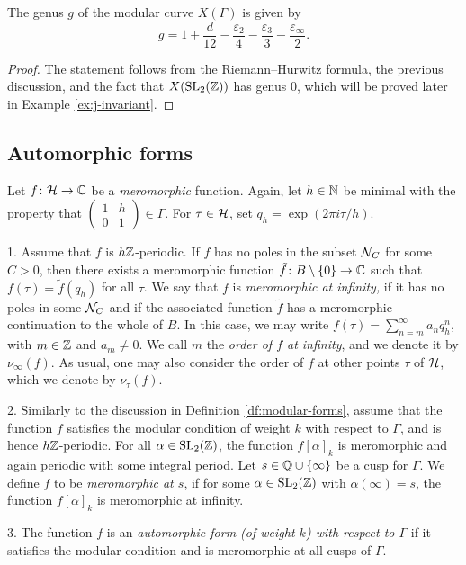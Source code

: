 \begin{prop}
 The genus $g$ of the modular curve $X(\Gamma)$ is given by
 \[g=1+\frac{d}{12}-\frac{\varepsilon_2}{4}-\frac{\varepsilon_3}{3}-\frac{\varepsilon_\infty}{2}.\]
\end{prop}

\begin{proof}
 The statement follows from the Riemann--Hurwitz formula, the previous discussion, and the fact that $X(\operatorname{SL}_2(\mathbb{Z}))$ has genus $0$, which will be proved later in Example \ref{ex:j-invariant}.
\end{proof}

\subsection{Automorphic forms}

\begin{defi}
 Let $f\colon \mathcal{H} \to \mathbb{C}$ be a \emph{meromorphic} function. Again, let $h\in\mathbb{N}$ be minimal with the property that $\left(\begin{smallmatrix}1 & h\\0 & 1\end{smallmatrix}\right)\in\Gamma$. For $\tau\in\mathcal{H}$, set $q_h=\exp(2\pi i\tau/h)$.

  1. Assume that $f$ is $h\mathbb{Z}$-periodic. If $f$ has no poles in the subset $\mathcal{N}_C$ for some $C>0$, then there exists a meromorphic function $\tilde f\colon B\setminus \{0\} \to \mathbb{C}$ such that $f(\tau)=\tilde f(q_h)$ for all $\tau$. We say that $f$ is \emph{meromorphic at infinity,} if it has no poles in some $\mathcal{N}_C$ and if the associated function $\tilde f$ has a meromorphic continuation to the whole of $B$. In this case, we may write $f(\tau)=\sum_{n=m}^\infty a_n q_h^n$, with $m\in\mathbb{Z}$ and $a_m\neq 0$. We call $m$ the \emph{order of $f$ at infinity}, and we denote it by $\nu_\infty(f)$. As usual, one may also consider the order of $f$ at other points $\tau$ of $\mathcal{H}$, which we denote by $\nu_\tau(f)$.
  
  2. Similarly to the discussion in Definition \ref{df:modular-forms}, assume that the function $f$ satisfies the modular condition of weight $k$ with respect to $\Gamma$, and is hence $h\mathbb{Z}$-periodic. For all $\alpha\in\operatorname{SL}_2(\mathbb{Z})$, the function $f[\alpha]_k$ is meromorphic and again periodic with some integral period. Let $s\in\mathbb{Q}\cup\{\infty\}$ be a cusp for $\Gamma$. We define $f$ to be \emph{meromorphic at $s$}, if for some $\alpha\in\operatorname{SL}_2(\mathbb{Z})$ with $\alpha (\infty)=s$, the function $f[\alpha]_k$ is meromorphic at infinity.
  
  3. The function $f$ is an \emph{automorphic form (of weight $k$) with respect to $\Gamma$} if it satisfies the modular condition and is meromorphic at all cusps of $\Gamma$.
\end{defi}


